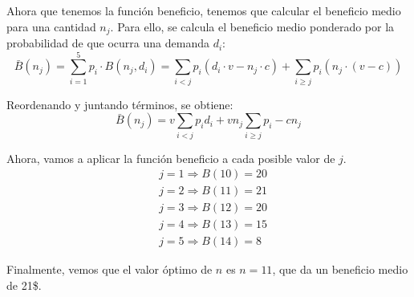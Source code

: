 \documentclass[12pt, letterpaper]{article}
\begin{document}
\newpage
Ahora que tenemos la función beneficio, tenemos que calcular el beneficio medio para una cantidad $n_j$. Para ello, se calcula el beneficio medio ponderado por la probabilidad de que ocurra una demanda $d_i$:
\[
    \bar{B}(n_j) = \sum_{i=1}^{5} p_i \cdot B(n_j,d_i) = 
    \sum_{i<j}p_i(d_i \cdot v - n_j \cdot c) + \sum_{i \geq j}p_i(n_j \cdot (v - c))
\]

Reordenando y juntando términos, se obtiene:
\[
    \bar{B}(n_j) = 
        v\sum_{i<j}p_i d_i + 
        v n_j \sum_{i \geq j} p_i -
        c n_j
\]

Ahora, vamos a aplicar la función beneficio a cada posible valor de $j$.
\begin{align*}
    & j = 1 \Rightarrow B(10) = 20 \\
    & j = 2 \Rightarrow B(11) = 21 \\
    & j = 3 \Rightarrow B(12) = 20 \\
    & j = 4 \Rightarrow B(13) = 15 \\
    & j = 5 \Rightarrow B(14) = 8
\end{align*}

Finalmente, vemos que el valor óptimo de $n$ es $n = 11$, que da un beneficio medio de 21\$.

\newpage
\end{document}
